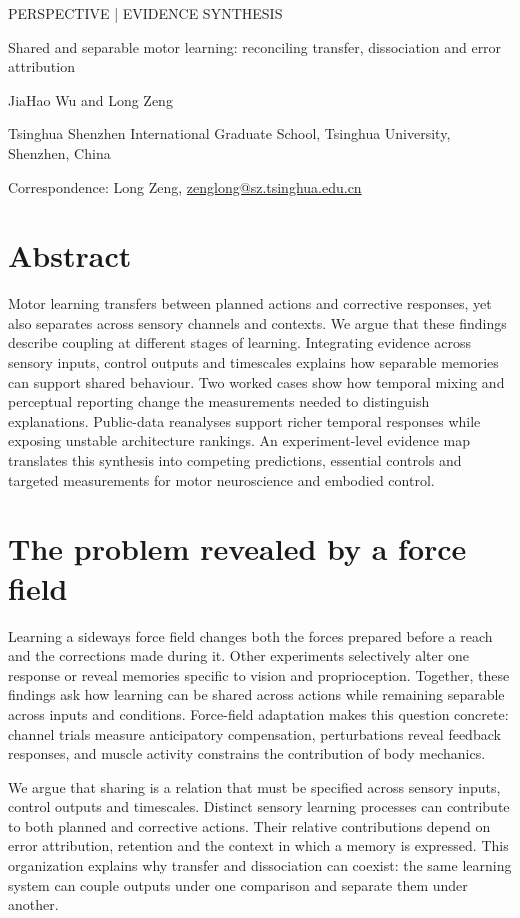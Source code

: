 \documentclass[11pt,a4paper]{article}
\begin{document}
\runninglinenumbers
{\small\sffamily\color{navy} PERSPECTIVE | EVIDENCE SYNTHESIS}\par\medskip
{\LARGE\bfseries\raggedright Shared and separable motor learning: reconciling transfer, dissociation and error attribution\par}\bigskip
{\normalsize JiaHao Wu and Long Zeng\par}
{\small Tsinghua Shenzhen International Graduate School, Tsinghua University, Shenzhen, China\par}\medskip
{}
{\small Correspondence: Long Zeng, \href{mailto:zenglong@sz.tsinghua.edu.cn}{zenglong@sz.tsinghua.edu.cn}\par}\medskip
\section{Abstract}
Motor learning transfers between planned actions and corrective responses, yet also separates across sensory channels and contexts. We argue that these findings describe coupling at different stages of learning. Integrating evidence across sensory inputs, control outputs and timescales explains how separable memories can support shared behaviour. Two worked cases show how temporal mixing and perceptual reporting change the measurements needed to distinguish explanations. Public-data reanalyses support richer temporal responses while exposing unstable architecture rankings. An experiment-level evidence map translates this synthesis into competing predictions, essential controls and targeted measurements for motor neuroscience and embodied control.

\section{The problem revealed by a force field}
Learning a sideways force field changes both the forces prepared before a reach and the corrections made during it. Other experiments selectively alter one response or reveal memories specific to vision and proprioception. Together, these findings ask how learning can be shared across actions while remaining separable across inputs and conditions. Force-field adaptation makes this question concrete: channel trials measure anticipatory compensation, perturbations reveal feedback responses, and muscle activity constrains the contribution of body mechanics. \cite{wagner2008,maeda2018,yousif2012,hayashi2020}

We argue that sharing is a relation that must be specified across sensory inputs, control outputs and timescales. Distinct sensory learning processes can contribute to both planned and corrective actions. Their relative contributions depend on error attribution, retention and the context in which a memory is expressed. This organization explains why transfer and dissociation can coexist: the same learning system can couple outputs under one comparison and separate them under another.
\end{document}
